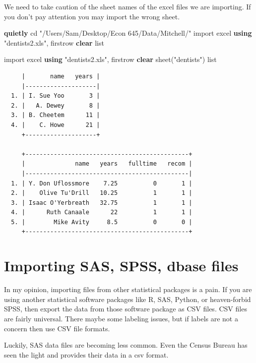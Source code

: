 \documentclass[
]{book}
\newenvironment{Shaded}{\begin{snugshade}}{\end{snugshade}}
\newcommand{\KeywordTok}[1]{\textcolor[rgb]{0.13,0.29,0.53}{\textbf{#1}}}
\newcommand{\NormalTok}[1]{#1}
\newcommand{\OtherTok}[1]{\textcolor[rgb]{0.56,0.35,0.01}{#1}}
\newcommand{\StringTok}[1]{\textcolor[rgb]{0.31,0.60,0.02}{#1}}
\begin{document}
We need to take caution of the sheet names of the excel files we are importing. If you don't pay attention you may import the wrong sheet.

\begin{Shaded}
\begin{Highlighting}[]
\KeywordTok{quietly}\NormalTok{ cd }\StringTok{"/Users/Sam/Desktop/Econ 645/Data/Mitchell/"}
\NormalTok{import excel }\KeywordTok{using} \StringTok{"dentists2.xls"}\NormalTok{, firstrow }\KeywordTok{clear}
\OtherTok{list}

\NormalTok{import excel }\KeywordTok{using} \StringTok{"dentists2.xls"}\NormalTok{, firstrow }\KeywordTok{clear}\NormalTok{ sheet(}\StringTok{"dentists"}\NormalTok{)}
\OtherTok{list}
\end{Highlighting}
\end{Shaded}

\begin{verbatim}
     |       name   years |
     |--------------------|
  1. | I. Sue Yoo       3 |
  2. |   A. Dewey       8 |
  3. | B. Cheetem      11 |
  4. |    C. Howe      21 |
     +--------------------+

     +----------------------------------------------+
     |              name   years   fulltime   recom |
     |----------------------------------------------|
  1. | Y. Don Uflossmore    7.25          0       1 |
  2. |    Olive Tu'Drill   10.25          1       1 |
  3. | Isaac O'Yerbreath   32.75          1       1 |
  4. |      Ruth Canaale      22          1       1 |
  5. |        Mike Avity     8.5          0       0 |
     +----------------------------------------------+
\end{verbatim}

\section{Importing SAS, SPSS, dbase files}\label{importing-sas-spss-dbase-files}

In my opinion, importing files from other statistical packages is a pain. If you are using another statistical software packages like R, SAS, Python, or heaven-forbid SPSS, then export the data from those software package as CSV files. CSV files are fairly universal. There maybe some labeling issues, but if labels are not a concern then use CSV file formats.

Luckily, SAS data files are becoming less common. Even the Census Bureau has seen the light and provides their data in a csv format.
\end{document}
